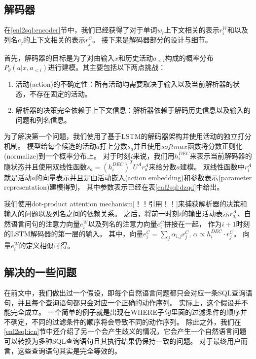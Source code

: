 \subsection{解码器}
\label{enl2sql:decoder}

在\ref{enl2sql:encoder}节中，我们已经获得了对于单词$w_i$上下文相关的表示$r^W_i$和以及列名$c_j$的上下文相关的表示$r^C_j$。
接下来是解码器部分的设计与细节。

首先，解码器的目标是为了对由输入$x$和历史活动$a_{<i}$构成的概率分布$P_{\theta}(a|x,a_{<i})$进行建模。其主要包括以下两点挑战：
\begin{enumerate}
  \item 活动(action)的不确定性：所有活动均需要取决于输入以及当前解析器的状态，不存在固定的活动。
  \item 解析器的决策完全依赖于上下文信息：解析器依赖于解码历史信息以及输入的问题和列名信息。
\end{enumerate}

为了解决第一个问题，我们使用了基于LSTM的解码器架构并使用活动的独立打分机制。
模型给每个候选的活动$a$打上分数$s_a$并且使用$softmax$函数将分数正则化(normalize)到一个概率分布上。
对于时刻$i$来说，我们用$h^{DEC}_i$来表示当前解码器的隐状态并且使用双线性函数$s_a = (h^{DEC}_i)^T U^A r^A_a$来给分数$a$建模。
双线性函数中$r^A_i$就是活动$a$的向量表示并且是由活动嵌入(action embedding)和参数表示(parameter representation)建模得到，
其中参数表示已经在表\ref{enl2sql:dzqd}中给出。

我们使用dot-product attention mechanism[！！引用！！]来捕获解析器的决策和输入的问题以及列名之间的依赖关系。
之后，将前一时刻$i$的输出活动表示$r^A_{a_i}$、自然语言问句的注意力向量$e^W_i$以及列名的注意力向量$e^C_i$拼接在一起，
作为$i+1$时刻的LSTM解码器的第一层的输入。
其中，向量$e^C_i = \sum_j \alpha_{i,j} r^C_j$,  $\alpha \propto h^{DEC}_i \cdot r^C_j$。
向量$e^W_i$的定义相似可得。



\subsection{解决的一些问题}
\label{enl2sql:ndo}

在前文中，我们做出过一个假设，即每个自然语言问题都只会对应一条SQL查询语句，并且每个查询语句都只会对应一个正确的动作序列。
实际上，这个假设并不能完全成立。
一个简单的例子就是出现在WHERE子句里面的过滤条件的顺序并不确定，不同的过滤条件的顺序将会导致不同的动作序列。
除此之外，我们在\ref{enl2sql:icn}节中还介绍了另一个会产生歧义的情况，它会产生一个自然语言问题可以转换为多种SQL查询语句且其执行结果仍保持一致的问题。
对于最终用户而言，这些查询语句其实是完全等效的。

